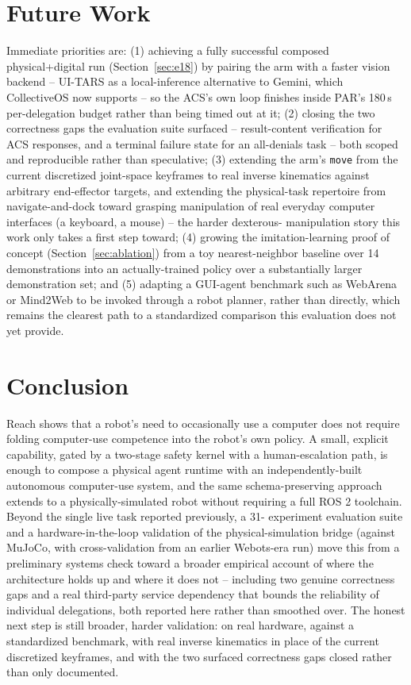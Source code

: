 \documentclass[conference]{IEEEtran}
\begin{document}
\section{Future Work}
\label{sec:future}
Immediate priorities are: (1) achieving a fully successful composed physical+digital run
(Section~\ref{sec:e18}) by pairing the arm with a faster vision backend -- UI-TARS as a local-inference
alternative to Gemini, which CollectiveOS now supports -- so the ACS's own loop finishes inside PAR's
180\,s per-delegation budget rather than being timed out at it; (2) closing the two correctness gaps the
evaluation suite surfaced -- result-content verification for ACS responses, and a terminal failure state
for an all-denials task -- both scoped and reproducible rather than speculative; (3) extending the arm's
\texttt{move} from the current discretized joint-space keyframes to real inverse kinematics against
arbitrary end-effector targets, and extending the physical-task repertoire from navigate-and-dock toward
grasping manipulation of real everyday computer interfaces (a keyboard, a mouse) -- the harder dexterous-
manipulation story this work only takes a first step toward; (4) growing the imitation-learning proof of
concept (Section~\ref{sec:ablation}) from a toy nearest-neighbor baseline over 14 demonstrations into an
actually-trained policy over a substantially larger demonstration set; and (5) adapting a GUI-agent
benchmark such as WebArena \cite{zhou2024webarena} or Mind2Web \cite{deng2023mind2web} to be invoked
through a robot planner, rather than directly, which remains the clearest path to a standardized
comparison this evaluation does not yet provide.

\section{Conclusion}
Reach shows that a robot's need to occasionally use a computer does not require folding computer-use
competence into the robot's own policy. A small, explicit capability, gated by a two-stage safety kernel
with a human-escalation path, is enough to compose a physical agent runtime with an independently-built
autonomous computer-use system, and the same schema-preserving approach extends to a physically-simulated
robot without requiring a full ROS 2 toolchain. Beyond the single live task reported previously, a 31-
experiment evaluation suite and a hardware-in-the-loop validation of the physical-simulation bridge
(against MuJoCo, with cross-validation from an earlier Webots-era run) move this from a preliminary
systems check toward a broader empirical account of where the architecture holds up and where it does
not -- including two genuine correctness gaps and a real third-party service dependency that bounds the
reliability of individual delegations, both reported here rather than smoothed over. The honest next step
is still broader, harder validation: on real hardware, against a standardized benchmark, with real
inverse kinematics in place of the current discretized keyframes, and with the two surfaced correctness
gaps closed rather than only documented.
\end{document}
